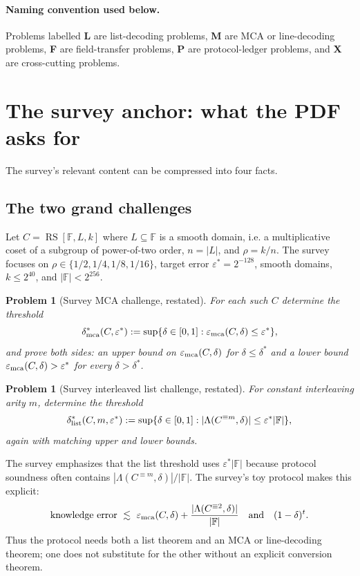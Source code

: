 \documentclass[11pt]{article}
\newtheorem{problem}[theorem]{Problem}
\theoremstyle{definition}
\theoremstyle{remark}
\newcommand{\F}{\mathbb F}
\newcommand{\eps}{\varepsilon}
\newcommand{\RS}{\operatorname{RS}}
\newcommand{\Int}[2]{#1^{\equiv #2}}
\newcommand{\emca}{\varepsilon_{\rm mca}}
\begin{document}
\paragraph{Naming convention used below.}  Problems labelled \textbf{L} are list-decoding problems, \textbf{M} are MCA or line-decoding problems, \textbf{F} are field-transfer problems, \textbf{P} are protocol-ledger problems, and \textbf{X} are cross-cutting problems.

\section{The survey anchor: what the PDF asks for}

The survey's relevant content can be compressed into four facts.

\subsection{The two grand challenges}

Let $C=\RS[\F,L,k]$ where $L\subseteq\F$ is a smooth domain, i.e. a multiplicative coset of a subgroup of power-of-two order, $n=|L|$, and $\rho=k/n$.  The survey focuses on $\rho\in\{1/2,1/4,1/8,1/16\}$, target error $\eps^*=2^{-128}$, smooth domains, $k\le 2^{40}$, and $|\F|<2^{256}$.

\begin{problem}[Survey MCA challenge, restated]
\label{prob:survey-mca}
For each such $C$ determine the threshold
\[
        \delta^*_{\rm mca}(C,\eps^*)
        :=\sup\{\delta\in[0,1]:\emca(C,\delta)\le\eps^*\},
\]
and prove both sides: an upper bound on $\emca(C,\delta)$ for $\delta\le\delta^*$ and a lower bound $\emca(C,\delta)>\eps^*$ for every $\delta>\delta^*$.
\end{problem}

\begin{problem}[Survey interleaved list challenge, restated]
\label{prob:survey-list}
For constant interleaving arity $m$, determine the threshold
\[
        \delta^*_{\rm list}(C,m,\eps^*)
        :=\sup\{\delta\in[0,1]: |\Lambda(\Int{C}{m},\delta)|\le \eps^*|\F|\},
\]
again with matching upper and lower bounds.
\end{problem}

The survey emphasizes that the list threshold uses $\eps^*|\F|$ because protocol soundness often contains $|\Lambda(\Int{C}{m},\delta)|/|\F|$.  The survey's toy protocol makes this explicit:
\[
        \text{knowledge error}\ \lesssim\
        \emca(C,\delta)+\frac{|\Lambda(\Int{C}{2},\delta)|}{|\F|}
        \quad\text{and}\quad
        (1-\delta)^t.
\]
Thus the protocol needs both a list theorem and an MCA or line-decoding theorem; one does not substitute for the other without an explicit conversion theorem.
\end{document}
